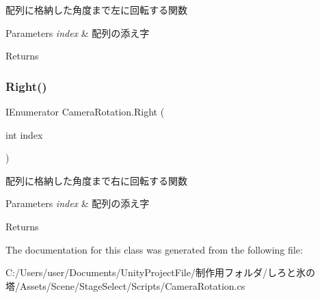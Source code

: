 配列に格納した角度まで左に回転する関数 


\begin{DoxyParams}{Parameters}
{\em index} & 配列の添え字\\
\hline
\end{DoxyParams}
\begin{DoxyReturn}{Returns}

\end{DoxyReturn}
\mbox{\label{class_camera_rotation_a96a7b98d4238c67c690dc8b62bbfb68b}} 
\subsubsection{\texorpdfstring{Right()}{Right()}}
{\footnotesize\ttfamily I\+Enumerator Camera\+Rotation.\+Right (\begin{DoxyParamCaption}\item[{int}]{index }\end{DoxyParamCaption})\hspace{0.3cm}{\ttfamily [inline]}}



配列に格納した角度まで右に回転する関数 


\begin{DoxyParams}{Parameters}
{\em index} & 配列の添え字\\
\hline
\end{DoxyParams}
\begin{DoxyReturn}{Returns}

\end{DoxyReturn}


The documentation for this class was generated from the following file\+:\begin{DoxyCompactItemize}
\item 
C\+:/\+Users/user/\+Documents/\+Unity\+Project\+File/制作用フォルダ/しろと氷の塔/\+Assets/\+Scene/\+Stage\+Select/\+Scripts/Camera\+Rotation.\+cs\end{DoxyCompactItemize}
